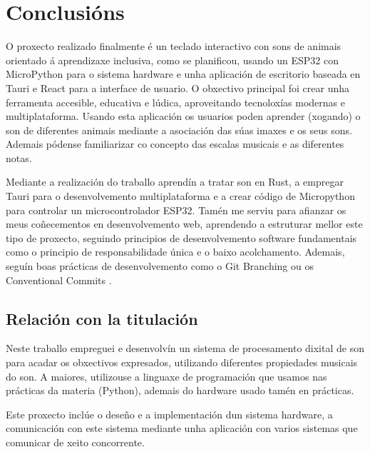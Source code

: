 \chapter{Conclusións}
\label{cap:conclusiones}

O proxecto realizado finalmente é un teclado interactivo con sons de animais orientado á aprendizaxe inclusiva, como se planificou, usando un ESP32 con MicroPython para o sistema hardware e unha aplicación de escritorio baseada en Tauri e React para a interface de usuario. O obxectivo principal foi crear unha ferramenta accesible, educativa e lúdica, aproveitando tecnoloxías modernas e multiplataforma. Usando esta aplicación os usuarios poden aprender (xogando) o son de diferentes animais mediante a asociación das súas imaxes e os seus sons. Ademais pódense familiarizar co concepto das escalas musicais e as diferentes notas.

Mediante a realización do traballo aprendín a tratar son en Rust, a empregar Tauri para o desenvolvemento multiplataforma e a crear código de Micropython para controlar un microcontrolador ESP32. Tamén me serviu para afianzar os meus coñecementos en desenvolvemento web, aprendendo a estruturar mellor este tipo de proxecto, seguindo principios de desenvolvemento software fundamentais como o principio de responsabilidade única e o baixo acolchamento. Ademais, seguín boas prácticas de desenvolvemento como o Git Branching ou os Conventional Commits \cite{Conventional}.



\section{Relación con la titulación}
Neste traballo empreguei e desenvolvín un sistema de procesamento dixital de son para acadar os obxectivos expresados, utilizando diferentes propiedades musicais do son. A maiores, utilizouse a linguaxe de programación que usamos nas prácticas da materia (Python), ademais do hardware usado tamén en prácticas.

Este proxecto inclúe o deseño e a implementación dun sistema hardware, a comunicación con este sistema mediante unha aplicación con varios sistemas que comunicar de xeito concorrente.   


